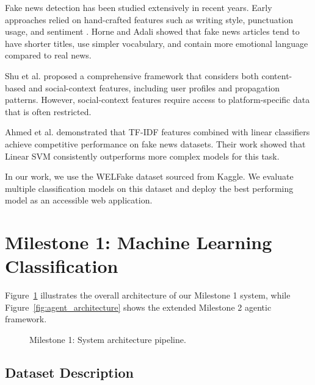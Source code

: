 \documentclass[conference]{IEEEtran}
\begin{document}
Fake news detection has been studied extensively in recent years. Early approaches relied on hand-crafted features such as writing style, punctuation usage, and sentiment \cite{horne2017just}. Horne and Adali showed that fake news articles tend to have shorter titles, use simpler vocabulary, and contain more emotional language compared to real news.

Shu et al. \cite{shu2017fake} proposed a comprehensive framework that considers both content-based and social-context features, including user profiles and propagation patterns. However, social-context features require access to platform-specific data that is often restricted.

Ahmed et al. \cite{ahmed2017detection} demonstrated that TF-IDF features combined with linear classifiers achieve competitive performance on fake news datasets. Their work showed that Linear SVM consistently outperforms more complex models for this task.

In our work, we use the WELFake dataset sourced from Kaggle. We evaluate multiple classification models on this dataset and deploy the best performing model as an accessible web application.

\section{Milestone 1: Machine Learning Classification}

Figure~\ref{fig:pipeline} illustrates the overall architecture of our Milestone 1 system, while Figure~\ref{fig:agent_architecture} shows the extended Milestone 2 agentic framework.

\begin{figure}[ht]
\centering
{}
\caption{Milestone 1: System architecture pipeline.}
\label{fig:pipeline}
\end{figure}

\subsection{Dataset Description}
\end{document}
